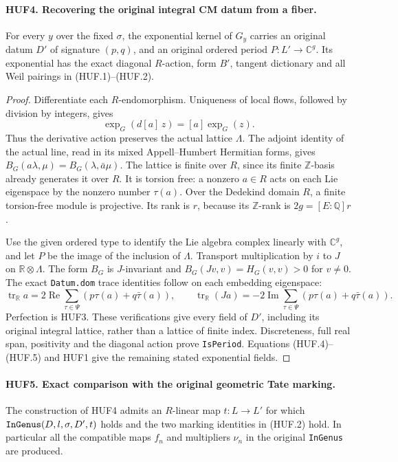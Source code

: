 \documentclass[11pt,a4paper]{article}
\numberwithin{equation}{section}
\theoremstyle{remark}\newtheorem{remark}[theorem]{Remark}
\begin{document}
\paragraph{HUF4. Recovering the original integral CM datum from a fiber.}
\label{claim:HUF4}
For every \(y\) over the fixed \(\sigma\), the exponential
kernel of \(G_y\) carries an original datum \(D'\) of
signature \((p,q)\), and an original ordered period
\(P:L'\to\mathbb C^g\).  Its exponential has the exact
diagonal \(R\)-action, form \(B'\), tangent dictionary and
all Weil pairings in (HUF.1)--(HUF.2).

\begin{proof}
Differentiate each \(R\)-endomorphism.  Uniqueness of local
flows, followed by division by integers, gives
\[
          \exp_G(d[a]\,z)=[a]\exp_G(z).
 \tag{HUF.5}
\]
Thus the derivative action preserves the actual lattice
\(\Lambda\).  The adjoint identity of the actual line, read
in its mixed Appell--Humbert Hermitian forms, gives
\(B_G(a\lambda,\mu)=B_G(\lambda,\bar a\mu)\).
The lattice is finite over \(R\), since its finite
\(\mathbb Z\)-basis already generates it over \(R\).
It is torsion free: a nonzero \(a\in R\) acts on each Lie
eigenspace by the nonzero number \(\tau(a)\).
Over the Dedekind domain \(R\), a finite torsion-free module
is projective.  Its rank is \(r\), because its
\(\mathbb Z\)-rank is \(2g=[E:\mathbb Q]r\).

Use the given ordered type to identify the Lie algebra
complex linearly with \(\mathbb C^g\), and let \(P\) be
the image of the inclusion of \(\Lambda\).
Transport multiplication by \(i\) to \(J\) on
\(\mathbb R\otimes\Lambda\).  The form \(B_G\) is
\(J\)-invariant and \(B_G(Jv,v)=H_G(v,v)>0\) for
\(v\ne0\).  The exact \texttt{Datum.\allowbreak dom} trace identities
follow on each embedding eigenspace:
\[
 \operatorname{tr}_{\mathbb R}a
   =2\operatorname{Re}\sum_{\tau\in\Psi}
                       (p\tau(a)+q\bar\tau(a)),\qquad
 \operatorname{tr}_{\mathbb R}(Ja)
   =-2\operatorname{Im}\sum_{\tau\in\Psi}
                       (p\tau(a)+q\bar\tau(a)).
\]
Perfection is HUF3.  These verifications give every field
of \(D'\), including its original integral lattice, rather
than a lattice of finite index.  Discreteness, full real
span, positivity and the diagonal action prove
\texttt{Is\allowbreak Period}.  Equations (HUF.4)--(HUF.5) and HUF1
give the remaining stated exponential fields.
\end{proof}

\paragraph{HUF5. Exact comparison with the original geometric Tate marking.}
\label{claim:HUF5}
The construction of HUF4 admits an \(R\)-linear map
\(t:L\to L'\) for which
\(\texttt{In\allowbreak Genus}(D,l,\sigma,D',t)\) holds and the two
marking identities in (HUF.2) hold.  In particular all
the compatible maps \(f_n\) and multipliers \(\nu_n\)
in the original \texttt{In\allowbreak Genus} are produced.
\end{document}
